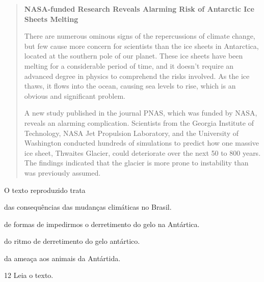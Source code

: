 \begin{quote}
\textbf{NASA-funded Research Reveals Alarming Risk of Antarctic Ice
Sheets Melting}

There are numerous ominous signs of the repercussions of climate change,
but few cause more concern for scientists than the ice sheets in
Antarctica, located at the southern pole of our planet. These ice sheets
have been melting for a considerable period of time, and it doesn't
require an advanced degree in physics to comprehend the risks involved.
As the ice thaws, it flows into the ocean, causing sea levels to rise,
which is an obvious and significant problem.

A new study published in the journal PNAS, which was funded by NASA,
reveals an alarming complication. Scientists from the Georgia Institute
of Technology, NASA Jet Propulsion Laboratory, and the University of
Washington conducted hundreds of simulations to predict how one massive
ice sheet, Thwaites Glacier, could deteriorate over the next 50 to 800
years. The findings indicated that the glacier is more prone to
instability than was previously assumed.

\end{quote}

O texto reproduzido trata

\begin{escolha}
\item das consequências das mudanças climáticas no Brasil.

\item de formas de impedirmos o derretimento do gelo na Antártica.

\item do ritmo de derretimento do gelo antártico.

\item da ameaça aos animais da Antártida.
\end{escolha}

\pagebreak
\num{12} Leia o texto.

